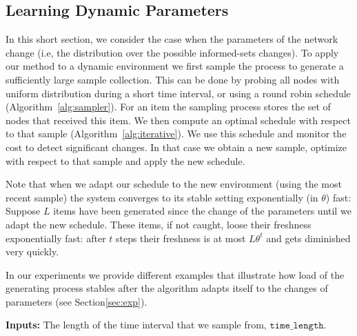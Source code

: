 \subsection{Learning Dynamic Parameters}\label{sec:dynamic}
In this short section, we consider the case when the parameters of the network change (i.e, the distribution over the possible informed-sets changes).  To apply our method to a dynamic environment we first sample the process to generate a sufficiently large sample collection. This can be done by probing
 all nodes with uniform distribution during a short time interval, or using a round robin schedule (Algorithm~\ref{alg:sampler}). For an item the sampling process stores the set of nodes that received this item. We then compute an optimal schedule with respect to that sample (Algorithm~\ref{alg:iterative}). We use this schedule and monitor the cost to detect significant changes. In that case we obtain a new sample, optimize with respect to that sample and apply the new schedule.

 Note that when we adapt our schedule to the new environment (using the most recent sample) the system converges to its stable setting exponentially (in $\theta$) fast: Suppose $L$ items have been generated since the change of the parameters until we adapt the new schedule. These items, if not caught, loose their freshness exponentially fast: after $t$ steps their freshness is at most $L\theta^t$ and gets diminished very quickly.

 In our experiments we provide different examples that illustrate how load of the generating process stables after the algorithm adapts itself to the changes of parameters (see Section\ref{sec:exp}).


\begin{algorithm}[!h]
\BlankLine
{\bf Inputs:} The length of the time interval that we sample from, $\texttt{time\_length}$.


\caption{$\sampler(\texttt{time\_length})$}\label{alg:sampler}
\end{algorithm}


